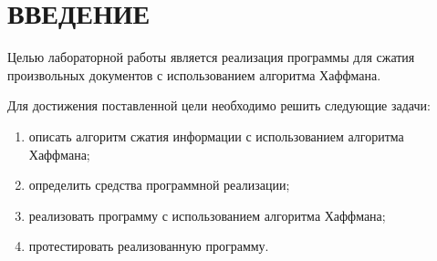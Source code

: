 \chapter*{ВВЕДЕНИЕ}

Целью лабораторной работы является реализация программы для сжатия произвольных документов с использованием алгоритма Хаффмана.

Для достижения поставленной цели необходимо решить следующие задачи:
\begin{enumerate}
	\item описать алгоритм сжатия информации с использованием алгоритма Хаффмана;
	\item определить средства программной реализации;
	\item реализовать программу с использованием алгоритма Хаффмана;
	\item протестировать реализованную программу.
\end{enumerate}
